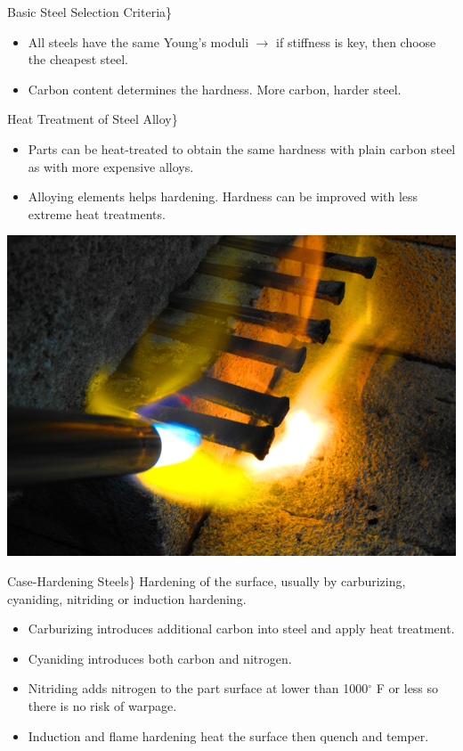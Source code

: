 \documentclass[10pt, svgnames]{beamer}
\begin{document}
\begin{frame}[label={sec:org24232ac}]{Basic Steel Selection Criteria\}}
\begin{itemize}
\item All steels have the same Young's moduli \(\rightarrow\) if stiffness is key, then choose the cheapest steel.
\item Carbon content determines the hardness. More carbon, harder steel.
\end{itemize}
\end{frame}



\begin{frame}[label={sec:org0cc5124}]{Heat Treatment of Steel Alloy\}}
\begin{itemize}
\item Parts can be heat-treated to obtain the same hardness with plain carbon steel as with more expensive alloys.
\item Alloying elements helps hardening. Hardness can be improved with less extreme heat treatments.
\end{itemize}

\vspace{0.3cm}
\centering
\includegraphics[height=0.4\textwidth]{pictures/heat-treatment}
\end{frame}



\begin{frame}[label={sec:org61e9918}]{Case-Hardening Steels\}}
Hardening of the surface, usually by carburizing, cyaniding, nitriding or induction hardening.

\begin{itemize}
\item Carburizing introduces additional carbon into steel and apply heat treatment.
\item Cyaniding introduces both carbon and nitrogen.
\item Nitriding adds nitrogen to the part surface at lower than 1000\(^{\circ}\) F or less so there is no risk of warpage.
\item Induction and flame hardening heat the surface then quench and temper.
\end{itemize}
\end{frame}
\end{document}
